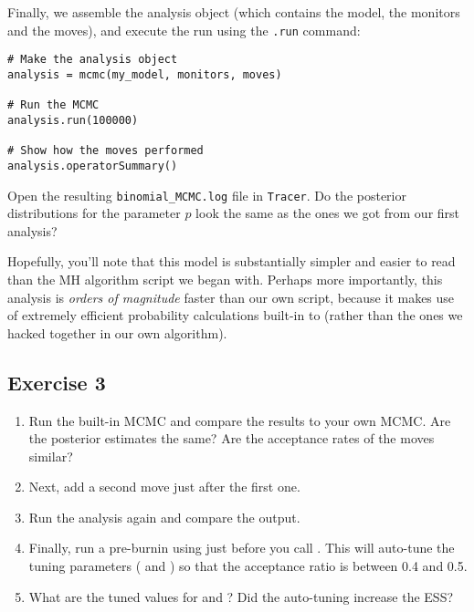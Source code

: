 Finally, we assemble the analysis object (which contains the model, the monitors and the moves), and execute the run using the \texttt{.run} command:
{\tt \begin{snugshade*}
\begin{lstlisting}    
# Make the analysis object
analysis = mcmc(my_model, monitors, moves)

# Run the MCMC
analysis.run(100000)

# Show how the moves performed
analysis.operatorSummary()
\end{lstlisting}
\end{snugshade*}}
\impmark Open the resulting \texttt{binomial\_MCMC.log} file in \texttt{Tracer}.
Do the posterior distributions for the parameter $p$ look the same as the ones we got from our first analysis?

Hopefully, you'll note that this \Rev model is substantially simpler and easier to read than the MH algorithm script we began with.
Perhaps more importantly, this \Rev analysis is \emph{orders of magnitude} faster than our own script, because it makes use of extremely efficient probability calculations built-in to \RevBayes (rather than the ones we hacked together in our own algorithm).

\subsection{Exercise 3}

\begin{enumerate}[label=\textnormal{Step \arabic*)}]
	\item Run the built-in MCMC and compare the results to your own MCMC. Are the posterior estimates the same? Are the acceptance rates of the moves similar?
	\item Next, add a second move  just after the first one.
	\item Run the analysis again and compare the output.
	\item Finally, run a pre-burnin using  just before you call . This will auto-tune the tuning parameters (\EG {} and ) so that the acceptance ratio is between 0.4 and 0.5.
	\item What are the tuned values for  and ? Did the auto-tuning increase the ESS?
\end{enumerate}

